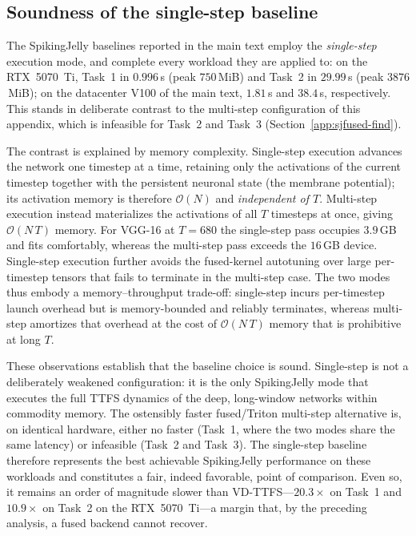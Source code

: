 \documentclass[runningheads]{llncs}
\begin{document}
\subsection{Soundness of the single-step baseline}\label{app:sjfused-singlestep}
The SpikingJelly baselines reported in the main text employ the \emph{single-step}
execution mode, and complete every workload they are applied to: on the
RTX~5070~Ti, Task~1 in $0.996$\,s (peak $750$\,MiB) and Task~2 in $29.99$\,s (peak
$3876$\,MiB); on the datacenter V100 of the main text, $1.81$\,s and $38.4$\,s,
respectively. This stands in deliberate contrast to the multi-step configuration of
this appendix, which is infeasible for Task~2 and Task~3
(Section~\ref{app:sjfused-find}).

The contrast is explained by memory complexity. Single-step execution advances the
network one timestep at a time, retaining only the activations of the current
timestep together with the persistent neuronal state (the membrane potential); its
activation memory is therefore $\mathcal{O}(N)$ and \emph{independent of $T$}.
Multi-step execution instead materializes the activations of all $T$ timesteps at
once, giving $\mathcal{O}(N\,T)$ memory. For VGG-16 at $T{=}680$ the single-step
pass occupies $3.9$\,GB and fits comfortably, whereas the multi-step pass exceeds
the $16$\,GB device. Single-step execution further avoids the fused-kernel
autotuning over large per-timestep tensors that fails to terminate in the
multi-step case. The two modes thus embody a memory--throughput trade-off:
single-step incurs per-timestep launch overhead but is memory-bounded and
reliably terminates, whereas multi-step amortizes that overhead at the cost of
$\mathcal{O}(N\,T)$ memory that is prohibitive at long $T$.

These observations establish that the baseline choice is sound. Single-step is not
a deliberately weakened configuration: it is the only SpikingJelly mode that
executes the full TTFS dynamics of the deep, long-window networks within commodity
memory. The ostensibly faster fused/Triton multi-step alternative is, on identical
hardware, either no faster (Task~1, where the two modes share the same latency) or
infeasible (Task~2 and Task~3). The single-step baseline therefore represents the
best achievable SpikingJelly performance on these workloads and constitutes a fair,
indeed favorable, point of comparison. Even so, it remains an order of magnitude
slower than VD-TTFS---$20.3\times$ on Task~1 and $10.9\times$ on Task~2 on the
RTX~5070~Ti---a margin that, by the preceding analysis, a fused backend cannot
recover.
\end{document}
